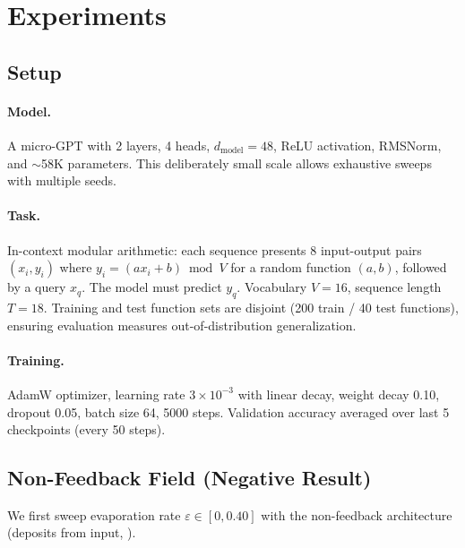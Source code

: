 \documentclass[11pt,a4paper]{article}
\newcommand{\evap}{\varepsilon}
\begin{document}
\section{Experiments}
\label{sec:experiments}

\subsection{Setup}

\paragraph{Model.}
A micro-GPT with 2 layers, 4 heads, $d_{\text{model}} = 48$,
ReLU activation, RMSNorm, and $\sim$58K parameters. This deliberately
small scale allows exhaustive sweeps with multiple seeds.

\paragraph{Task.}
In-context modular arithmetic: each sequence presents 8 input-output
pairs $(x_i, y_i)$ where $y_i = (ax_i + b) \bmod V$ for a random
function $(a, b)$, followed by a query $x_q$. The model must predict
$y_q$. Vocabulary $V = 16$, sequence length $T = 18$.
Training and test function sets are disjoint (200 train / 40 test
functions), ensuring evaluation measures out-of-distribution
generalization.

\paragraph{Training.}
AdamW optimizer, learning rate $3 \times 10^{-3}$ with linear decay,
weight decay 0.10, dropout 0.05, batch size 64, 5000 steps.
Validation accuracy averaged over last 5 checkpoints (every 50 steps).

\subsection{Non-Feedback Field (Negative Result)}

We first sweep evaporation rate $\evap \in [0, 0.40]$ with the
non-feedback architecture (deposits from input, ).
\end{document}
